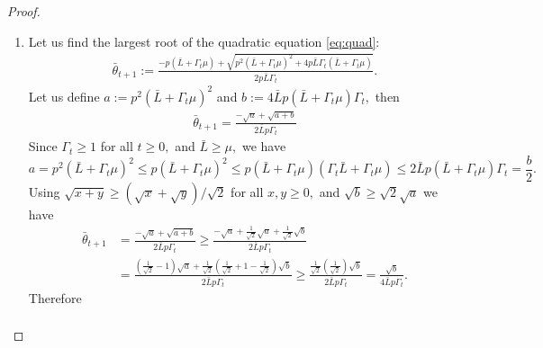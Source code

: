 \documentclass{article} %
\theoremstyle{plain}
\theoremstyle{definition}
\theoremstyle{remark}
\newcommand{\eqdef}{:=}
\begin{document}
\begin{proof}
\begin{enumerate}
  \begin{align*}
    p \bar{L} \Gamma_t \theta^2_{t+1} \leq (\bar{L} + \Gamma_t \mu) \left(1 - p \theta_{t+1}\right)
  \end{align*}
  and
  \begin{align*}
    \bar{L} \theta_{t+1} \frac{p \theta_{t+1} \Gamma_t}{\left(1 - p \theta_{t+1}\right)} \leq (\bar{L} + \Gamma_t \mu).
  \end{align*}
  Using the definition of $\gamma_{t+1},$ we obtain
  \begin{align*}
    \bar{L} \theta_{t+1} \gamma_{t+1} \leq (\bar{L} + \Gamma_t \mu)
  \end{align*}
  for all $t \geq 0.$
  \item Let us find the largest root of the quadratic equation \eqref{eq:quad}:
  \begin{align}
    \label{eq:theta_sol}
    \bar{\theta}_{t+1} \eqdef \frac{-p (\bar{L} + \Gamma_t \mu) + \sqrt{p^2 (\bar{L} + \Gamma_t \mu)^2 + 4 p \bar{L} \Gamma_t (\bar{L} + \Gamma_t \mu)}}{2 p \bar{L} \Gamma_t}.
  \end{align}
  Let us define $a \eqdef p^2\left(\bar{L} + \Gamma_{t} \mu\right)^2$ and $b \eqdef 4 \bar{L} p \left(\bar{L} + \Gamma_{t} \mu\right) \Gamma_{t},$
then
\begin{align*}
  \bar{\theta}_{t+1} = \frac{-\sqrt{a} + \sqrt{a + b}}{2 \bar{L} p \Gamma_t}
\end{align*}
Since $\Gamma_{t} \geq 1$ for all $t \geq 0,$ and $\bar{L} \geq \mu,$ we have $$a = p^2\left(\bar{L} + \Gamma_{t} \mu\right)^2 \leq p\left(\bar{L} + \Gamma_{t} \mu\right)^2 \leq p\left(\bar{L} + \Gamma_{t} \mu\right)\left(\Gamma_{t} \bar{L} + \Gamma_{t} \mu\right) \leq 2 \bar{L} p \left(\bar{L} + \Gamma_{t} \mu\right)\Gamma_{t} = \frac{b}{2}.$$
Using $\sqrt{x + y} \geq \left(\sqrt{x} + \sqrt{y}\right) / \sqrt{2}$ for all $x, y \geq 0, $ and $\sqrt{b} \geq \sqrt{2} \sqrt{a}$ we have
\begin{align*}
  \bar{\theta}_{t+1} &= \frac{-\sqrt{a} + \sqrt{a + b}}{2 \bar{L} p \Gamma_t} \geq \frac{-\sqrt{a} + \frac{1}{\sqrt{2}}\sqrt{a} + \frac{1}{\sqrt{2}}\sqrt{b}}{2 \bar{L} p \Gamma_t} \\
  &= \frac{\left(\frac{1}{\sqrt{2}} - 1\right)\sqrt{a} + \frac{1}{\sqrt{2}} \left(\frac{1}{\sqrt{2}} + 1 - \frac{1}{\sqrt{2}}\right)\sqrt{b}}{2 \bar{L} p \Gamma_t} \geq \frac{\frac{1}{\sqrt{2}} \left(\frac{1}{\sqrt{2}}\right)\sqrt{b}}{2 \bar{L} p \Gamma_t} = \frac{\sqrt{b}}{4 \bar{L} p \Gamma_t}.
\end{align*}
Therefore
\begin{align*}

\end{align*}
\end{enumerate}
\end{proof}
\end{document}
